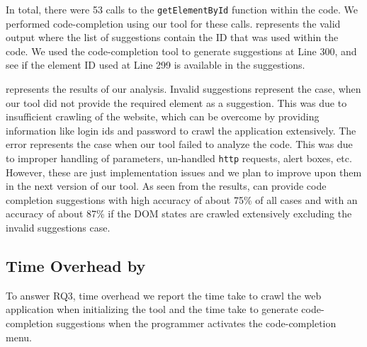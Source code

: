 	In total, there were 53 calls to the \texttt{getElementById} function within the \javascript code. We performed code-completion using our tool for these calls.     represents the valid output where the list of suggestions contain the ID that was used within the code. We used the code-completion tool to generate suggestions at Line 300, and see if the element ID used at Line 299 is available in the suggestions. 
	
	 represents the results of our analysis. Invalid suggestions represent the case, when our tool did not provide the required element as a suggestion. This was due to insufficient crawling of the website, which can be overcome by providing information like login ids and password to crawl the application extensively. The error represents the case when our tool failed to analyze the \javascript code. This was due to improper handling of parameters, un-handled \texttt{http} requests, alert boxes, etc. However, these are just implementation issues and we plan to improve upon them in the next version of our tool. As seen from the results, \dompletion can provide code completion suggestions with high accuracy of about 75\% of all cases and with an accuracy of about 87\% if the DOM states are crawled extensively \ie excluding the invalid suggestions case.
	
	
	
	\subsection{Time Overhead by \dompletion}
	\label{SecOverhead}
	To answer RQ3, \ie time overhead we report the time take to crawl the web application when initializing the tool and the time take to generate code-completion suggestions when the programmer activates the code-completion menu.
	
